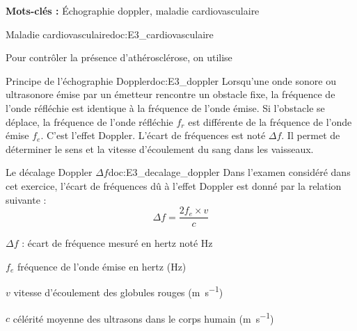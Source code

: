 
\textbf{Mots-clés :} Échographie doppler, maladie cardiovasculaire
\medskip

\begin{doc}{Maladie cardiovasculaire}{doc:E3_cardiovasculaire}

   Pour contrôler la présence d'athérosclérose, on utilise 
\end{doc}

\begin{doc}{Principe de l'échographie Doppler}{doc:E3_doppler}
  Lorsqu'une onde sonore ou ultrasonore émise par un émetteur rencontre un obstacle fixe, la fréquence de l'onde réfléchie est identique à la fréquence de l'onde émise.
  Si l'obstacle se déplace, la fréquence de l'onde réfléchie $f_r$ est différente de la fréquence de l'onde émise $f_e$.
  C'est l'effet Doppler.
  L'écart de fréquences est noté $\Delta f$.
  Il permet de déterminer le sens et la vitesse d'écoulement du sang dans les vaisseaux.
\end{doc}

\begin{doc}{Le décalage Doppler $\Delta f$}{doc:E3_decalage_doppler}
  Dans l'examen considéré dans cet exercice, l'écart de fréquences dû à l'effet Doppler est donné par la relation suivante :
  \begin{equation*}
    \Delta f = \dfrac{2f_e \times v}{c}
  \end{equation*}
  \begin{listePoints}
    \item $\Delta f$ : écart de fréquence mesuré en hertz noté \unit{\hertz}
    \item $f_e$ fréquence de l'onde émise en hertz (\unit{\hertz})
    \item $v$ vitesse d'écoulement des globules rouges (\unit{\m\per\s})
    \item $c$ célérité moyenne des ultrasons dans le corps humain (\unit{\m\per\s})
  \end{listePoints}
\end{doc}

